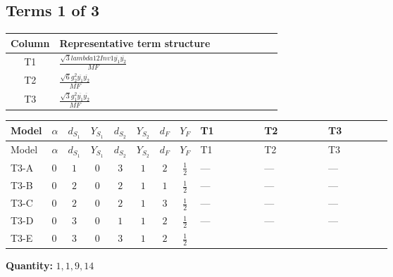 \documentclass[8pt]{article}
\begin{document}
\begin{landscape}
\subsection*{Terms 1 of 3}
\begin{center}
\begin{tabular}{@{}c >{\raggedright\arraybackslash}p{0.82\linewidth}@{}}
\toprule
Column & Representative term structure \\
\midrule
T1 & \(\displaystyle \frac{\sqrt{3} lambda12Inv1 \overline{y_{1}} \overline{y_{2}}}{MF}\) \\
\midrule
T2 & \(\displaystyle \frac{\sqrt{6} g_{2}^{2} \overline{y_{1}} \overline{y_{2}}}{MF}\) \\
\midrule
T3 & \(\displaystyle \frac{\sqrt{3} g_{1}^{2} \overline{y_{1}} \overline{y_{2}}}{MF}\) \\
\midrule
\bottomrule
\end{tabular}
\end{center}
\smallskip
\tiny
\begin{longtable}{@{}llcccccc >{\raggedright\arraybackslash}p{0.21\linewidth} >{\raggedright\arraybackslash}p{0.21\linewidth} >{\raggedright\arraybackslash}p{0.21\linewidth}@{}}
\toprule
Model & $\alpha$ & $d_{S_1}$ & $Y_{S_1}$ & $d_{S_2}$ & $Y_{S_2}$ & $d_F$ & $Y_F$ & T1 & T2 & T3 \\
\midrule
\endfirsthead
\toprule
Model & $\alpha$ & $d_{S_1}$ & $Y_{S_1}$ & $d_{S_2}$ & $Y_{S_2}$ & $d_F$ & $Y_F$ & T1 & T2 & T3 \\
\midrule
\endhead
T3-A & $0$ & $1$ & $0$ & $3$ & $1$ & $2$ & $\frac{1}{2}$ & --- & --- & --- \\
\midrule
T3-B & $0$ & $2$ & $0$ & $2$ & $1$ & $1$ & $\frac{1}{2}$ & --- & --- & --- \\
\midrule
T3-C & $0$ & $2$ & $0$ & $2$ & $1$ & $3$ & $\frac{1}{2}$ & --- & --- & --- \\
\midrule
T3-D & $0$ & $3$ & $0$ & $1$ & $1$ & $2$ & $\frac{1}{2}$ & --- & --- & --- \\
\midrule
T3-E & $0$ & $3$ & $0$ & $3$ & $1$ & $2$ & $\frac{1}{2}$ & \scriptsize\adjustbox{max width=\linewidth}{$\begin{gathered} - \frac{\sqrt{3} lambda12Inv1 \overline{y_{1}} \overline{y_{2}}}{6 MF}\end{gathered}$} & \scriptsize\adjustbox{max width=\linewidth}{$\begin{gathered} \frac{\sqrt{6} g_{2}^{2} \overline{y_{1}} \overline{y_{2}}}{3 MF}\end{gathered}$} & \scriptsize\adjustbox{max width=\linewidth}{$\begin{gathered} \frac{\sqrt{3} g_{1}^{2} \overline{y_{1}} \overline{y_{2}}}{8 MF}\end{gathered}$} \\
\midrule
\bottomrule
\end{longtable}
\clearpage
\noindent\textbf{Quantity: }$\mathrm{1,1,9,14}$\par\smallskip

\end{landscape}
\end{document}
